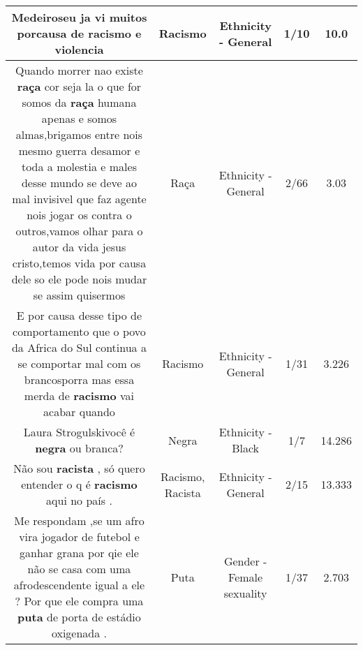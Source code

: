 \documentclass[11pt]{article}
\newlength\mylength
\begin{document}
\begin{center}
\begin{longtable}{|C{.65\mylength}|C{.30\mylength}|C{.12\mylength}|C{.12\mylength}|C{.12\mylength}|}
  \small {} Medeiros​eu ja vi muitos porcausa de \textbf{racismo} e violencia\normalsize   & Racismo & Ethnicity - General & 1/10 & 10.0 \\  \hline
  \small Quando  morrer  nao  existe  \textbf{raça}  cor  seja  la  o  que  for  somos  da  \textbf{raça}  humana  apenas  e  somos  almas,brigamos  entre  nois  mesmo  guerra  desamor  e  toda  a  molestia  e  males  desse  mundo  se  deve  ao  mal  invisivel  que  faz  agente  nois  jogar  os  contra  o  outros,vamos  olhar  para  o  autor  da  vida  jesus  cristo,temos  vida  por  causa  dele  so  ele  pode  nois  mudar  se  assim  quisermos\normalsize   & Raça & Ethnicity - General & 2/66 & 3.03 \\  \hline
  \small E por causa desse tipo de comportamento que   o povo da Africa do Sul continua a se comportar mal com os brancosporra mas essa merda de \textbf{racismo} vai acabar quando\normalsize   & Racismo & Ethnicity - General & 1/31 & 3.226 \\  \hline
  \small Laura Strogulskivocê é \textbf{negra} ou branca?\normalsize   & Negra & Ethnicity - Black & 1/7 & 14.286 \\  \hline
  \small Não sou \textbf{racista} , só quero entender o q é \textbf{racismo} aqui no país .\normalsize   & Racismo, Racista & Ethnicity - General & 2/15 & 13.333 \\  \hline
  \small Me respondam ,se um afro vira jogador de futebol e ganhar grana por qie ele não se casa com uma afrodescendente igual a ele ? Por que  ele compra uma \textbf{puta} de porta de estádio oxigenada .\normalsize   & Puta & Gender - Female sexuality & 1/37 & 2.703 \\  \hline

\end{longtable}
\end{center}
\end{document}

